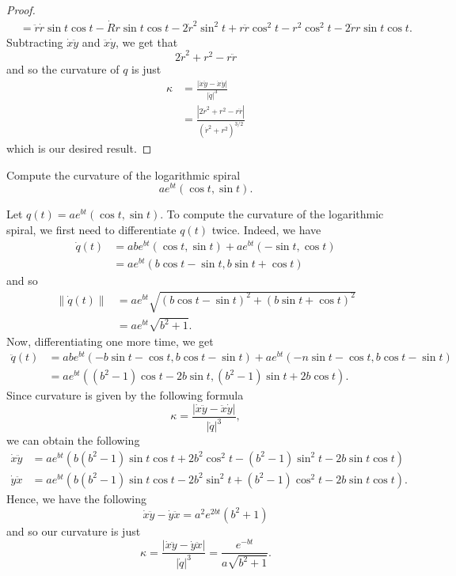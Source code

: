 \documentclass[a4paper]{article}
\begin{document}
\begin{proof}
\begin{align*}
                         &= \ddot{r} \dot{r} \sin t \cos t - \dot{R} r \sin t \cos t - 2 \dot{r}^{2} \sin^{2} t + r \ddot{r} \cos^{2} t - r^{2} \cos^{2}t - 2 \dot{r} r \sin t \cos t. 
    \end{align*}
    Subtracting \( \dot{x} \ddot{y}   \) and \( \ddot{x} \dot{y} \), we get that 
    \[  2 \dot{r}^{2} + r^{2} - r \ddot{r} \]
    and so the curvature of \( q  \) is just
    \begin{align*}
        \kappa &= \frac{ | \dot{x} \ddot{y} - \dot{x} \dot{y} | }{ | \dot{q} |^{3} }  \\
               &= \frac{ | 2 \dot{r}^{2} + r^{2} - r \ddot{r} |  }{ (\dot{r}^{2} + r^{2})^{3/2} }
    \end{align*}
    which is our desired result.

\end{proof}



\begin{problem}
    Compute the curvature of the logarithmic spiral
    \[ a e^{b t} (\cos t , \sin t). \]
\end{problem}
\begin{solution}
Let \( q(t) = a e^{bt} (\cos t, \sin t) \). To compute the curvature of the logarithmic spiral, we first need to differentiate \( q(t)  \) twice. Indeed, we have 
\begin{align*}
    \dot{q}(t) &= ab e^{bt } (\cos t, \sin t) + a e^{bt } (-\sin t, \cos t) \\
               &= ae^{bt } (b \cos t - \sin t, b \sin t + \cos t )
\end{align*}
and so 
\begin{align*}
    \| \dot{q}(t) \| &= a e^{bt } \sqrt{ (b \cos t  - \sin t )^{2} + (b \sin t + \cos t)^{2} }   \\
        &= a e^{bt } \sqrt{ b^{2} + 1  }.
\end{align*}
Now, differentiating one more time, we get 
\begin{align*}  \ddot{q}(t) &= ab e^{bt } (-b \sin t - \cos t , b \cos t - \sin t ) + a e^{bt } (-n \sin t - \cos t , b \cos t - \sin t )  \\
    &= a e^{bt } ((b^{2} - 1) \cos t - 2b \sin t , (b^{2} - 1 ) \sin t + 2b \cos t).
\end{align*}
Since curvature is given by the following formula
\[  \kappa = \frac{ | \dot{x} \ddot{y} - \ddot{x} \dot{y} |  }{ | \dot{q} |^{3}  },  \]
we can obtain the following 
\begin{align*}
    \dot{x} \ddot{y} &= a e^{bt } (b(b^{2} -1)\sin t \cos t + 2 b^{2} \cos^{2} t - (b^{2} - 1) \sin^{2} t - 2b \sin t \cos t  )  \\
    \dot{y} \ddot{x} &= ae^{bt } (b (b^{2} -1) \sin t \cos t - 2 b^{2} \sin^{2} t + (b^{2} - 1) \cos^{2}t - 2b \sin t \cos t ).
\end{align*}
Hence, we have the following
\[  \dot{x} \ddot{y} - \dot{y} \ddot{x} = a^{2} e^{2bt} (b^{2} + 1) \]
and so our curvature is just 
\[  \kappa = \frac{ | \dot{x} \ddot{y} - \dot{y} \ddot{x} |  }{ | \dot{q} |^{3}  }  = \frac{ e^{-bt} }{ a \sqrt{ b^{2} + 1 }  }. \]
\end{solution}
\end{document}

